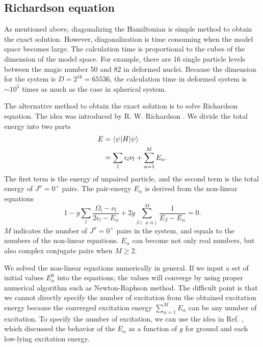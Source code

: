 \documentclass[11pt]{book} %
\begin{document}
\subsection{Richardson equation}
As mentioned above, diagonalizing the Hamiltonian is simple method to obtain the exact solution.
However, diagonalization is time consuming when the model space becomes large. The calculation time is proportional to the cubes of the dimension of the model space. For example, there are 16 single particle levels between the magic number 50 and 82 in deformed nuclei. Because the dimension for the system is $D=2^{16}=65536$, the calculation time in deformed system is $\sim 10^5$ times as much as the case in spherical system. \par
The alternative method to obtain the exact solution is to solve Richardson equation. The idea was introduced by R. W. Richardson \cite{Richardson1, Richardson2, Richardson3, Richardson4, Richardson5}. We divide the total energy into two parts
\begin{align}
  E &= \braket{\psi|H|\psi} \\
  &= \sum_l \epsilon_l \nu_l + \sum_{\alpha=1}^M E_{\alpha} .
\end{align}
The first term is the energy of unpaired particle, and the second term is the total energy of $J^{\pi}=0^+$ pairs. The pair-energy $E_{\alpha}$ is derived from the non-linear equations
\begin{equation}
  1 - g\sum_l \frac{\Omega_l-\nu_l}{2\epsilon_l-E_{\alpha}} + 2g\sum_{\beta(\neq\alpha)}^M \frac{1}{E_{\beta}-E_{\alpha}} = 0 .
\end{equation}
$M$ indicates the number of $J^{\pi}=0^+$ pairs in the system, and equals to the numbers of the non-linear equations. $E_{\alpha}$ can become not only real numbers, but also complex conjugate pairs when $M\ge 2$. 

We solved the non-linear equations numerically in general. If we input a set of initial values $E_{\alpha}^{0}$ into the equations, the values will converge by using proper numerical algorithm such as Newton-Raphson method. The difficult point is that we cannot directly specify the number of excitation from the obtained excitation energy because the converged excitation energy $\sum_{\alpha=1}^M E_{\alpha}$ can be any number of excitation. To specify the number of excitation, we can use the idea in Ref. \cite{Richardson4}, which discussed the behavior of the $E_{\alpha}$ as a function of $g$ for ground and each low-lying excitation energy. 
\end{document}
